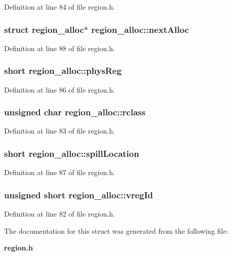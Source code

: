 Definition at line 84 of file region.h.
\subsubsection{\setlength{\rightskip}{0pt plus 5cm}struct \bf{region\_\-alloc}$\ast$ \bf{region\_\-alloc::next\-Alloc}}\label{structregion__alloc_e168c14bcf82fd1b8d2e06b7efd2e7bc}




Definition at line 88 of file region.h.
\subsubsection{\setlength{\rightskip}{0pt plus 5cm}short \bf{region\_\-alloc::phys\-Reg}}\label{structregion__alloc_b8fe016205bdc1724b1a6a489fc22b06}




Definition at line 86 of file region.h.
\subsubsection{\setlength{\rightskip}{0pt plus 5cm}unsigned char \bf{region\_\-alloc::rclass}}\label{structregion__alloc_86d9e361c04fe291cd8c709526141f40}




Definition at line 83 of file region.h.
\subsubsection{\setlength{\rightskip}{0pt plus 5cm}short \bf{region\_\-alloc::spill\-Location}}\label{structregion__alloc_cfe36d1acf35de25e52e332b9e674e99}




Definition at line 87 of file region.h.
\subsubsection{\setlength{\rightskip}{0pt plus 5cm}unsigned short \bf{region\_\-alloc::vreg\-Id}}\label{structregion__alloc_7a56230f1985160ab25a7c5dd075701f}




Definition at line 82 of file region.h.

The documentation for this struct was generated from the following file:\begin{CompactItemize}
\item 
\bf{region.h}\end{CompactItemize}

